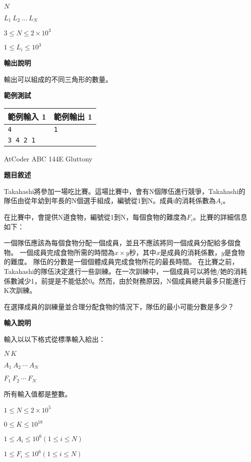     $N$
    
    $L_1\ L_2\ ...\ L_N$
    
    $3 \le N \le 2 \times 10^3$
    
    $1 \le L_i \le 10^3$

    \textbf{輸出說明}

    輸出可以組成的不同三角形的數量。

    \textbf{範例測試}

    \begin{tabular}{|m{7cm}|m{7cm}|}
        \hline
        範例輸入 1 & 範例輸出 1 \\
        \hline
        \verb|4| & \verb|1| \\
        \verb|3 4 2 1| & \\
        \hline
    \end{tabular}

    \problem AtCoder ABC 144E Gluttony

    \textbf{題目敘述}

    Takahashi將參加一場吃比賽。這場比賽中，會有N個隊伍進行競爭，Takahashi的隊伍由從年幼到年長的N個選手組成，編號從1到N。成員i的消耗係數為$A_i$。

    在比賽中，會提供N道食物，編號從1到N，每個食物的難度為$F_i$。比賽的詳細信息如下：
    
    一個隊伍應該為每個食物分配一個成員，並且不應該將同一個成員分配給多個食物。
    一個成員完成食物所需的時間為$x \times y$秒，其中$x$是成員的消耗係數，$y$是食物的難度。
    隊伍的分數是一個個體成員完成食物所花的最長時間。
    在比賽之前，Takahashi的隊伍決定進行一些訓練。在一次訓練中，一個成員可以將他/她的消耗係數減少1，前提是不能低於0。然而，由於財務原因，N個成員總共最多只能進行K次訓練。
    
    在選擇成員的訓練量並合理分配食物的情況下，隊伍的最小可能分數是多少？

    \textbf{輸入說明}

    輸入以以下格式從標準輸入給出：

    $N \ K$
    
    $A_1\ A_2\ \cdots\ A_N$
    
    $F_1\ F_2\ \cdots\ F_N$
    
    所有輸入值都是整數。
    
    $1 \le N \le 2 \times 10^5$
    
    $0 \le K \le 10^{18}$
    
    $1 \le A_i \le 10^6 (1 \le i \le N)$
    
    $1 \le F_i \le 10^6 (1 \le i \le N)$

